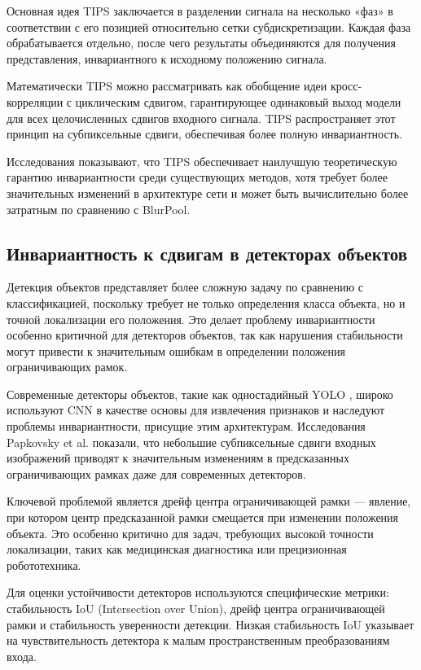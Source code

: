 Основная идея TIPS заключается в разделении сигнала на несколько «фаз» в соответствии с его позицией относительно сетки субдискретизации. Каждая фаза обрабатывается отдельно, после чего результаты объединяются для получения представления, инвариантного к исходному положению сигнала.

Математически TIPS можно рассматривать как обобщение идеи кросс-корреляции с циклическим сдвигом, гарантирующее одинаковый выход модели для всех целочисленных сдвигов входного сигнала. TIPS распространяет этот принцип на субпиксельные сдвиги, обеспечивая более полную инвариантность.

Исследования показывают, что TIPS обеспечивает наилучшую теоретическую гарантию инвариантности среди существующих методов, хотя требует более значительных изменений в архитектуре сети и может быть вычислительно более затратным по сравнению с BlurPool.

\subsection{Инвариантность к сдвигам в детекторах объектов}
\label{review:detectors}

Детекция объектов представляет более сложную задачу по сравнению с классификацией, поскольку требует не только определения класса объекта, но и точной локализации его положения. Это делает проблему инвариантности особенно критичной для детекторов объектов, так как нарушения стабильности могут привести к значительным ошибкам в определении положения ограничивающих рамок.

Современные детекторы объектов, такие как одностадийный YOLO \cite{redmon2016yolo}, широко используют CNN в качестве основы для извлечения признаков и наследуют проблемы инвариантности, присущие этим архитектурам. Исследования Papkovsky et al. \cite{papkovsky2023shift} показали, что небольшие субпиксельные сдвиги входных изображений приводят к значительным изменениям в предсказанных ограничивающих рамках даже для современных детекторов.

Ключевой проблемой является дрейф центра ограничивающей рамки — явление, при котором центр предсказанной рамки смещается при изменении положения объекта. Это особенно критично для задач, требующих высокой точности локализации, таких как медицинская диагностика или прецизионная робототехника.

Для оценки устойчивости детекторов используются специфические метрики: стабильность IoU (Intersection over Union), дрейф центра ограничивающей рамки и стабильность уверенности детекции. Низкая стабильность IoU указывает на чувствительность детектора к малым пространственным преобразованиям входа.

